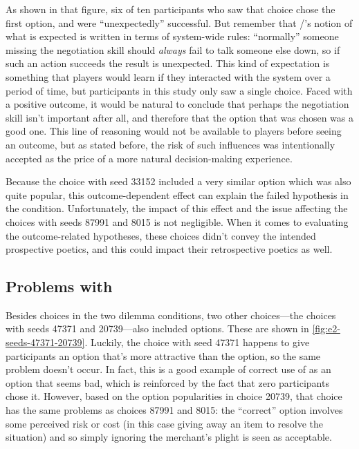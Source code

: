 As shown in that figure, six of ten participants who saw that choice chose the first option, and were ``unexpectedly'' successful.
%
But remember that \dunyazad/'s notion of what is expected is written in terms of system-wide rules: ``normally'' someone missing the negotiation skill should \emph{always} fail to talk someone else down, so if such an action succeeds the result is unexpected.
%
This kind of expectation is something that players would learn if they interacted with the system over a period of time, but participants in this study only saw a single choice.
%
Faced with a positive outcome, it would be natural to conclude that perhaps the negotiation skill isn't important after all, and therefore that the option that was chosen was a good one.
%
This line of reasoning would not be available to players before seeing an outcome, but as stated before, the risk of such influences was intentionally accepted as the price of a more natural decision-making experience.


Because the choice with seed 33152 included a very similar  option which was also quite popular, this outcome-dependent effect can explain the failed hypothesis in the \unxs{} condition.
%
Unfortunately, the impact of this effect and the  issue affecting the choices with seeds 87991 and 8015 is not negligible.
%
When it comes to evaluating the outcome-related hypotheses, these choices didn't convey the intended prospective poetics, and this could impact their retrospective poetics as well.


\subsection{Problems with }
\label{sec:e2-travel-onwards}

Besides choices in the two dilemma conditions, two other choices---the \obvs{} choices with seeds 47371 and 20739---also included  options.
%
These are shown in \cref{fig:e2-seeds-47371-20739}.
%
Luckily, the choice with seed 47371 happens to give participants an option that's more attractive than the  option, so the same problem doesn't occur.
%
In fact, this is a good example of correct use of  as an option that seems bad, which is reinforced by the fact that zero participants chose it.
%
However, based on the option popularities in choice 20739, that choice has the same problems as choices 87991 and 8015: the ``correct'' option involves some perceived risk or cost (in this case giving away an item to resolve the situation) and so simply ignoring the merchant's plight is seen as acceptable.


